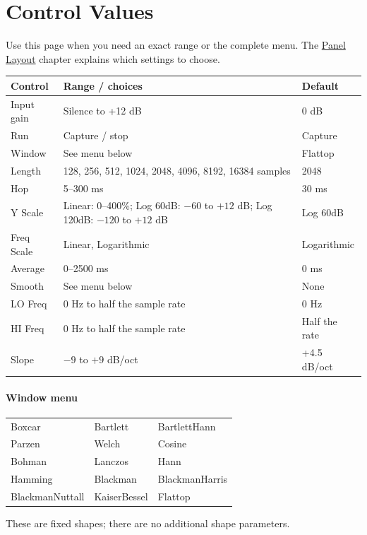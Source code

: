 \clearpage
\section{Control Values}\label{sec:control-values}

Use this page when you need an exact range or the complete menu. The
\hyperref[sec:panel]{Panel Layout} chapter explains which settings to choose.

\begin{center}
\renewcommand{\arraystretch}{1.2}
\begin{tabularx}{\textwidth}{@{}lXl@{}}
\toprule
\textbf{Control} & \textbf{Range / choices} & \textbf{Default} \\
\midrule
Input gain & Silence to +12 dB & 0 dB \\
Run & Capture / stop & Capture \\
Window & See menu below & Flattop \\
Length & 128, 256, 512, 1024, 2048, 4096, 8192, 16384 samples & 2048 \\
Hop & 5--300 ms & 30 ms \\
Y Scale & Linear: 0--400\%; Log 60dB: $-60$ to $+12$ dB; Log 120dB: $-120$ to $+12$ dB & Log 60dB \\
Freq Scale & Linear, Logarithmic & Logarithmic \\
Average & 0--2500 ms & 0 ms \\
Smooth & See menu below & None \\
LO Freq & 0 Hz to half the sample rate & 0 Hz \\
HI Freq & 0 Hz to half the sample rate & Half the rate \\
Slope & $-9$ to $+9$ dB/oct & +4.5 dB/oct \\
\bottomrule
\end{tabularx}
\end{center}

\paragraph{Window menu}
\begin{center}
\begin{tabularx}{\textwidth}{@{}XXX@{}}
Boxcar & Bartlett & BartlettHann \\
Parzen & Welch & Cosine \\
Bohman & Lanczos & Hann \\
Hamming & Blackman & BlackmanHarris \\
BlackmanNuttall & KaiserBessel & Flattop \\
\end{tabularx}
\end{center}
These are fixed shapes; there are no additional shape parameters.

